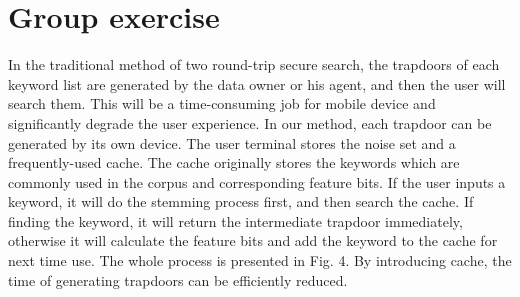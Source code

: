 \documentclass[paper=a4, fontsize=11pt]{scrartcl} %
\numberwithin{equation}{section} %
\numberwithin{figure}{section} %
\numberwithin{table}{section} %
\begin{document}
\section{Group exercise}
	In the traditional method of two round-trip secure search, the trapdoors of each keyword list are generated by the data owner or his agent, and then the user will search them. This will be a time-consuming job for mobile device and significantly degrade the user experience. In our method, each trapdoor can be generated by its own device.\newline
	The user terminal stores the noise set and a frequently-used cache. The cache originally stores the keywords which are commonly used in the corpus and corresponding feature bits. If the user inputs a keyword, it will do the stemming process first, and then search the cache. If finding the keyword, it will return the intermediate trapdoor immediately, otherwise it will calculate the feature bits and add the keyword to the cache for next time use. The whole process is presented in Fig. 4. By introducing cache, the time of generating trapdoors can be efficiently reduced.



\end{document}
